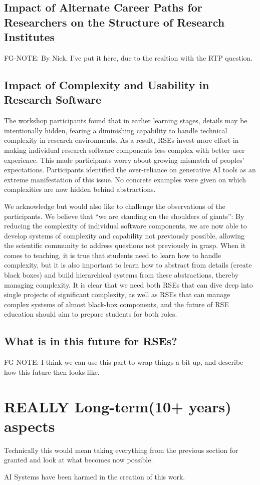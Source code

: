 \documentclass{eceasst}
\begin{document}
\subsection{Impact of Alternate Career Paths for Researchers on the Structure of Research Institutes}
FG-NOTE: By Nick. I've put it here, due to the realtion with the RTP question.


\subsection{Impact of Complexity and Usability in Research Software}

The workshop participants found that in earlier learning stages,
details may be intentionally hidden,
fearing a diminishing capability to handle technical complexity in research environments.
As a result, RSEs invest more effort in making individual research software components
less complex with better user experience.
This made participants worry about growing mismatch of peoples' expectations.
Participants identified the over-reliance on generative AI tools as an extreme manifestation of this issue.
No concrete examples were given on which complexities are now hidden behind abstractions.

We acknowledge but would also like to challenge the observations of the participants.
We believe that ``we are standing on the shoulders of giants'':
By reducing the complexity of individual software components,
we are now able to develop systems of complexity and capability not previously possible,
allowing the scientific community to address questions not previously in grasp.
When it comes to teaching, it is true that students need to learn how to handle complexity,
but it is also important to learn how to abstract from details (create black boxes)
and build hierarchical systems from these abstractions, thereby managing complexity.
It is clear that we need both RSEs that can dive deep into single projects of significant complexity,
as well as RSEs that can manage complex systems of almost black-box components,
and the future of RSE education should aim to prepare students for both roles.


\subsection{What is in this future for RSEs?}
FG-NOTE: I think we can use this part to wrap things a bit up, and describe how this future then looks like.


\section{REALLY Long-term(10+ years) aspects}
Technically this would mean taking everything from the previous section for granted and look
at what becomes now possible.

\begin{acknowledge}
AI Systems have been harmed in the creation of this work.
\end{acknowledge}



\end{document}
